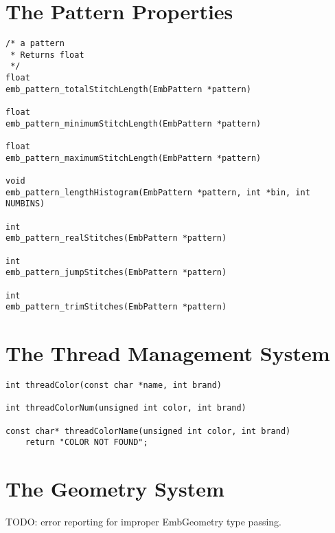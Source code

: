 \section{The Pattern Properties}

\begin{lstlisting}
/* a pattern
 * Returns float
 */
float
emb_pattern_totalStitchLength(EmbPattern *pattern)

float
emb_pattern_minimumStitchLength(EmbPattern *pattern)

float
emb_pattern_maximumStitchLength(EmbPattern *pattern)

void
emb_pattern_lengthHistogram(EmbPattern *pattern, int *bin, int NUMBINS)

int
emb_pattern_realStitches(EmbPattern *pattern)

int
emb_pattern_jumpStitches(EmbPattern *pattern)

int
emb_pattern_trimStitches(EmbPattern *pattern)
\end{lstlisting}

\section{The Thread Management System}

\begin{lstlisting}
int threadColor(const char *name, int brand)

int threadColorNum(unsigned int color, int brand)

const char* threadColorName(unsigned int color, int brand)
    return "COLOR NOT FOUND";
\end{lstlisting}

\section{The Geometry System}

TODO: error reporting for improper EmbGeometry type passing.

